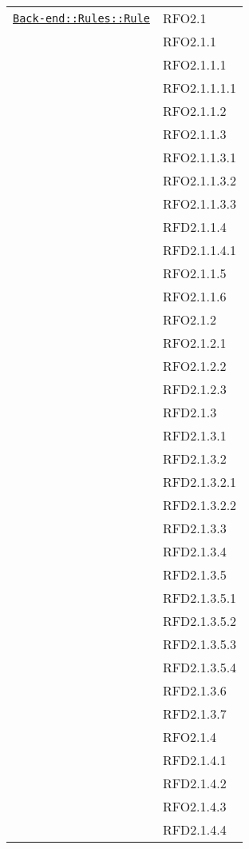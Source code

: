\begin{longtable}{|>{\centering}m{10cm}|m{3cm}<{\centering}|}
\hyperref[Back-end::Rules::Rule]{\texttt{Back-end::Rules::Rule}} & RFO2.1\\
& RFO2.1.1\\
& RFO2.1.1.1\\
& RFO2.1.1.1.1\\
& RFO2.1.1.2\\
& RFO2.1.1.3\\
& RFO2.1.1.3.1\\
& RFO2.1.1.3.2\\
& RFO2.1.1.3.3\\
& RFD2.1.1.4\\
& RFD2.1.1.4.1\\
& RFO2.1.1.5\\
& RFO2.1.1.6\\
& RFO2.1.2\\
& RFO2.1.2.1\\
& RFO2.1.2.2\\
& RFD2.1.2.3\\
& RFD2.1.3\\
& RFD2.1.3.1\\
& RFD2.1.3.2\\
& RFD2.1.3.2.1\\
& RFD2.1.3.2.2\\
& RFD2.1.3.3\\
& RFD2.1.3.4\\
& RFD2.1.3.5\\
& RFD2.1.3.5.1\\
& RFD2.1.3.5.2\\
& RFD2.1.3.5.3\\
& RFD2.1.3.5.4\\
& RFD2.1.3.6\\
& RFD2.1.3.7\\
& RFO2.1.4\\
& RFD2.1.4.1\\
& RFD2.1.4.2\\
& RFO2.1.4.3\\
& RFD2.1.4.4\\ \hline


\end{longtable}
